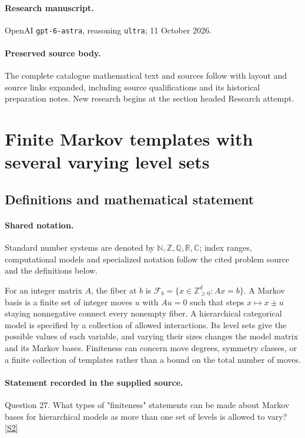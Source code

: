 \documentclass[11pt]{article}
\begin{document}
\paragraph{Research manuscript.} OpenAI \texttt{gpt-6-astra}, reasoning \texttt{ultra}; 11 October 2026.
\paragraph{Preserved source body.} The complete catalogue mathematical text and sources follow with layout and source links expanded, including source qualifications and its historical preparation notes. New research begins at the section headed Research attempt.

\section{Finite Markov templates with several varying level sets}\label{statement}

\subsection{Definitions and mathematical statement}

\paragraph{Shared notation.}Standard number systems are denoted by $\mathbb N,\mathbb Z,\mathbb Q,\mathbb R,\mathbb C$; index ranges, computational models and specialized notation follow the cited problem source and the definitions below.


For an integer matrix $A$, the fiber at $b$ is $\mathcal F_b=\{x\in\mathbb Z_{\ge0}^d:Ax=b\}$. A Markov basis is a finite set of integer moves $u$ with $Au=0$ such that steps $x\mapsto x\pm u$ staying nonnegative connect every nonempty fiber. A hierarchical categorical model is specified by a collection of allowed interactions. Its level sets give the possible values of each variable, and varying their sizes changes the model matrix and its Markov bases. Finiteness can concern move degrees, symmetry classes, or a finite collection of templates rather than a bound on the total number of moves.
\paragraph{Statement recorded in the supplied source.}
Question 27. What types of "finiteness" statements can be made about Markov bases for hierarchical models as more than one set of levels is allowed to vary? \href{https://aimath.org/WWN/compalgstat/compalgstat.pdf}{[S2]}
\end{document}
